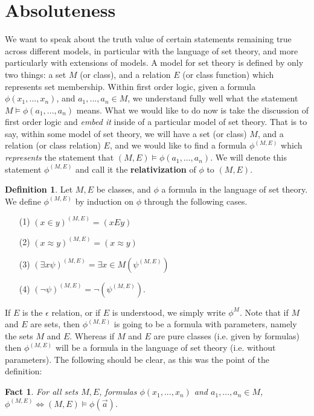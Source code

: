 \documentclass{article}
\theoremstyle{definition}
\newtheorem{definition}{Definition}[section]
\theoremstyle{plain}
\theoremstyle{theorem}
\newtheorem{fact}{Fact}[section]
\begin{document}
\section{Absoluteness}
	We want to speak about the truth value of certain statements remaining true across different models, in particular with the language of set theory, and more particularly with extensions of models. A model for set theory is defined by only two things: a set $M$ (or class), and a relation $E$ (or class function) which represents set membership. Within first order logic, given a formula $\phi(x_1,...,x_n)$, and $a_1,...,a_n \in M$, we understand fully well what the statement $M \models \phi(a_1,...,a_n)$ means. What we would like to do now is take the discussion of first order logic and \textit{embed it} inside of a particular model of set theory. That is to say, within some model of set theory, we will have a set (or class) $M$, and a relation (or class relation) $E$, and we would like to find a formula $\phi^{(M,E)}$ which \textit{represents} the statement that $(M,E) \models \phi(a_1,...,a_n)$. We will denote this statement $\phi^{(M,E)}$ and call it the \textbf{relativization} of $\phi$ to $(M,E)$. 
	\begin{definition}
		Let $M,E$ be classes, and $\phi$ a formula in the language of set theory. We define $\phi^{(M,E)}$ by induction on $\phi$ through the following cases.
		\begin{itemize}
			\item[(1)]
				$(x \in y)^{(M,E)} = (xEy)$
			\item[(2)]
				$(x \approx y)^{(M,E)} = (x \approx y)$
			\item[(3)]
				$(\exists x \psi)^{(M,E)} = \exists x\in M(\psi^{(M,E)})$
			\item[(4)]
				$(\neg \psi)^{(M,E)} = \neg(\psi^{(M,E)})$. 
		\end{itemize}
	\end{definition}
If $E$ is the $\epsilon$ relation, or if $E$ is understood, we simply write $\phi^M$. Note that if $M$ and $E$ are sets, then $\phi^{(M,E)}$ is going to be a formula with parameters, namely the sets $M$ and $E$. Whereas if $M$ and $E$ are pure classes (i.e. given by formulas) then $\phi^{(M,E)}$ will be a formula in the language of set theory (i.e. without parameters). The following should be clear, as this was the point of the definition:
\begin{fact}
	For all sets $M,E$, formulas $\phi(x_1,...,x_n)$ and $a_1,...,a_n \in M$, $\phi^{(M,E)} \iff (M,E) \models \phi(\vec{a})$. 
\end{fact}
\end{document}
